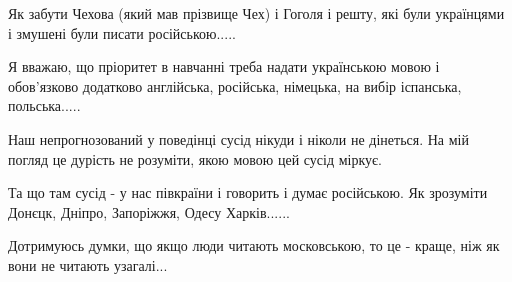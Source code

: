 Як забути Чехова (який мав прізвище Чех) і Гоголя і решту, які були українцями
і змушені були писати російською.....

Я вважаю, що пріоритет в навчанні треба надати українською мовою і обов'язково
додатково англійська, російська, німецька, на вибір іспанська, польська.....

Наш непрогнозований у поведінці сусід нікуди і ніколи не дінеться. На мій
погляд це дурість не розуміти, якою мовою цей сусід міркує.

Та що там сусід - у нас півкраїни і говорить і думає російською. Як зрозуміти
Донєцк, Дніпро, Запоріжжя, Одесу Харків......

 
Дотримуюсь думки, що якщо люди читають московською, то це - краще, ніж як вони не читають узагалі...


